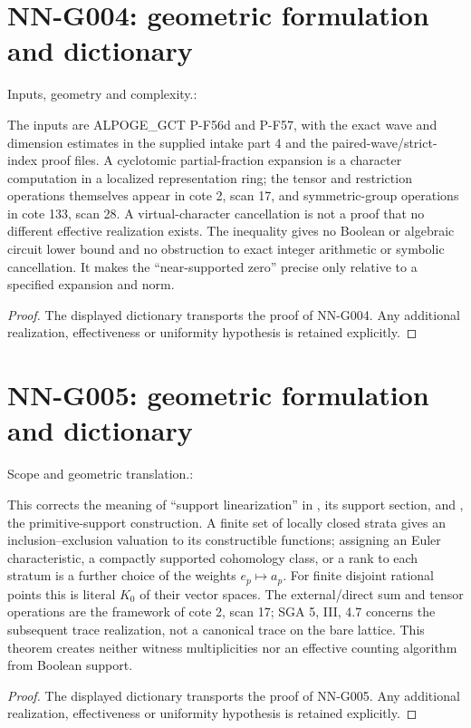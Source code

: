 \section{NN-G004: geometric formulation and dictionary}
\begin{geometricstatement}[NN-G004]
Inputs, geometry and complexity.:

The inputs are ALPOGE\_GCT P-F56d and P-F57, with the exact wave
and dimension estimates in the supplied intake part 4 and the
paired-wave/strict-index proof files. A cyclotomic partial-fraction
expansion is a character computation in a localized representation
ring; the tensor and restriction operations themselves appear in
cote 2, scan 17, and symmetric-group operations in cote 133,
scan 28. A virtual-character cancellation is not a proof that
no different effective realization exists. The inequality gives
no Boolean or algebraic circuit lower bound and no obstruction
to exact integer arithmetic or symbolic cancellation. It makes
the ``near-supported zero'' precise only relative to a specified
expansion and norm.


\end{geometricstatement}
\begin{proof} The displayed dictionary transports the proof of NN-G004. Any additional realization, effectiveness or uniformity hypothesis is retained explicitly.\end{proof}


\section{NN-G005: geometric formulation and dictionary}
\begin{geometricstatement}[NN-G005]
Scope and geometric translation.:

This corrects the meaning of ``support linearization'' in
, its support section,
and , the
primitive-support construction. A finite set of locally closed
strata gives an inclusion--exclusion valuation to its constructible
functions; assigning an Euler characteristic, a compactly supported
cohomology class, or a rank to each stratum is a further choice of
the weights $e_p\mapsto a_p$. For finite disjoint rational points
this is literal $K_0$ of their vector spaces. The external/direct
sum and tensor operations are the framework of cote 2, scan 17;
SGA 5, III, 4.7 concerns the subsequent trace realization, not a
canonical trace on the bare lattice. This theorem creates neither
witness multiplicities nor an effective counting algorithm from
Boolean support.


\end{geometricstatement}
\begin{proof} The displayed dictionary transports the proof of NN-G005. Any additional realization, effectiveness or uniformity hypothesis is retained explicitly.\end{proof}


